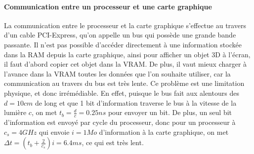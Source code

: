 \documentclass[a4paper,10pt]{article}
\begin{document}
\paragraph{Communication entre un processeur et une carte graphique}
La communication entre le processeur et la carte graphique s'effectue au travers d'un cable PCI-Express, qu'on appelle un bus qui possède une grande bande passante. Il n'est pas possible d'accéder directement à une information stockée dans la RAM depuis la carte graphique, ainsi pour afficher un objet 3D à l'écran, il faut d'abord copier cet objet dans la VRAM. De plus, il vaut mieux charger à l'avance dans la VRAM toutes les données que l'on souhaite utiliser, car la communication au travers du bus est très lente. Ce problème est une limitation physique, et donc irrémédiable. En effet, puisque le bus fait aux alentours des $d = 10cm$ de long et que 1 bit d'information traverse le bus à la vitesse de la lumière $c$, on met $t_b = \frac{d}{c}=0.25ns$ pour envoyer un bit. De plus, un seul bit d'information est envoyé par cycle du processeur, donc pour un processeur à $c_s = 4GHz$ qui envoie $i=1Mo$ d'information à la carte graphique, on met $\Delta t = (t_b + \frac{2}{c_s})i = 6.4ms$, ce qui est très lent.
\end{document}

